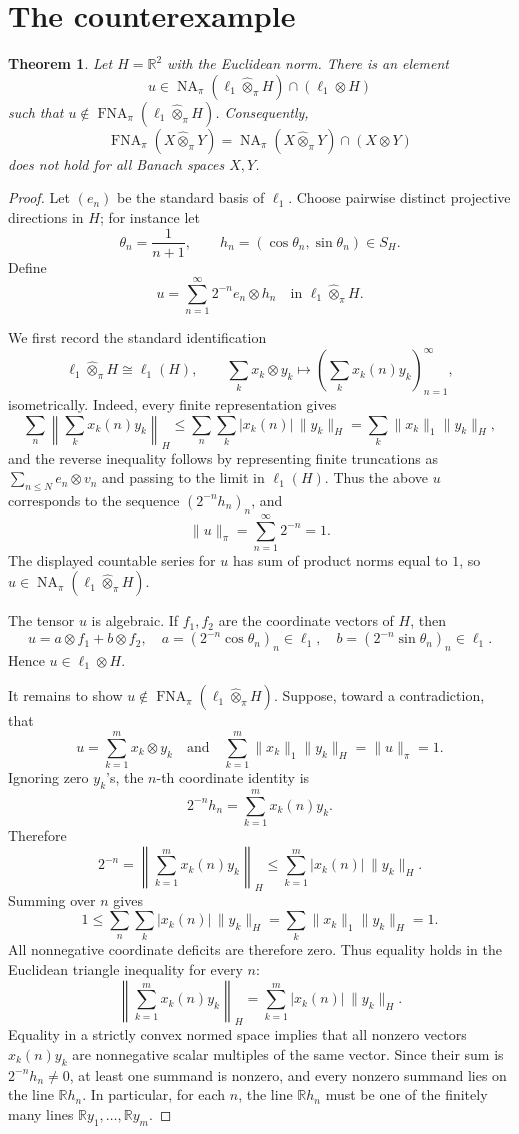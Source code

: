 \documentclass[11pt]{article}
\newtheorem{theorem}{Theorem}
\newcommand{\FNA}{\operatorname{FNA}}
\newcommand{\NA}{\operatorname{NA}}
\newcommand{\R}{\mathbb{R}}
\newcommand{\whot}{\widehat{\otimes}_{\pi}}
\begin{document}
\section*{The counterexample}

\begin{theorem}
Let \(H=\R^2\) with the Euclidean norm.  There is an element
\[
  u\in \NA_{\pi}(\ell_1\whot H)\cap(\ell_1\otimes H)
\]
such that \(u\notin \FNA_{\pi}(\ell_1\whot H)\).  Consequently,
\[
 \FNA_{\pi}(X\whot Y)=\NA_{\pi}(X\whot Y)\cap(X\otimes Y)
\]
does not hold for all Banach spaces \(X,Y\).
\end{theorem}

\begin{proof}
Let \((e_n)\) be the standard basis of \(\ell_1\).  Choose pairwise distinct
projective directions in \(H\); for instance let
\[
  \theta_n=\frac{1}{n+1},\qquad
  h_n=(\cos\theta_n,\sin\theta_n)\in S_H.
\]
Define
\[
  u=\sum_{n=1}^{\infty}2^{-n}e_n\otimes h_n
  \quad\text{in }\ell_1\whot H .
\]

We first record the standard identification
\[
  \ell_1\whot H \cong \ell_1(H),\qquad
  \sum_k x_k\otimes y_k\mapsto
  \left(\sum_k x_k(n)y_k\right)_{n=1}^{\infty},
\]
isometrically.  Indeed, every finite representation gives
\[
  \sum_n\left\|\sum_k x_k(n)y_k\right\|_H
  \leq \sum_n\sum_k |x_k(n)|\,\|y_k\|_H
  =\sum_k\|x_k\|_1\|y_k\|_H,
\]
and the reverse inequality follows by representing finite truncations as
\(\sum_{n\leq N}e_n\otimes v_n\) and passing to the limit in \(\ell_1(H)\).
Thus the above \(u\) corresponds to the sequence
\((2^{-n}h_n)_n\), and
\[
  \|u\|_{\pi}=\sum_{n=1}^{\infty}2^{-n}=1.
\]
The displayed countable series for \(u\) has sum of product norms equal to
\(1\), so \(u\in\NA_{\pi}(\ell_1\whot H)\).

The tensor \(u\) is algebraic.  If \(f_1,f_2\) are the coordinate vectors of
\(H\), then
\[
  u=a\otimes f_1+b\otimes f_2,
  \quad
  a=(2^{-n}\cos\theta_n)_n\in\ell_1,\quad
  b=(2^{-n}\sin\theta_n)_n\in\ell_1.
\]
Hence \(u\in \ell_1\otimes H\).

It remains to show \(u\notin\FNA_{\pi}(\ell_1\whot H)\).  Suppose, toward a
contradiction, that
\[
  u=\sum_{k=1}^{m}x_k\otimes y_k
  \quad\text{and}\quad
  \sum_{k=1}^{m}\|x_k\|_1\|y_k\|_H=\|u\|_{\pi}=1.
\]
Ignoring zero \(y_k\)'s, the \(n\)-th coordinate identity is
\[
  2^{-n}h_n=\sum_{k=1}^{m}x_k(n)y_k.
\]
Therefore
\[
  2^{-n}
  =\left\|\sum_{k=1}^{m}x_k(n)y_k\right\|_H
  \leq \sum_{k=1}^{m}|x_k(n)|\,\|y_k\|_H .
\]
Summing over \(n\) gives
\[
  1
  \leq
  \sum_n\sum_k |x_k(n)|\,\|y_k\|_H
  =
  \sum_k\|x_k\|_1\|y_k\|_H
  =1.
\]
All nonnegative coordinate deficits are therefore zero.  Thus equality holds
in the Euclidean triangle inequality for every \(n\):
\[
  \left\|\sum_{k=1}^{m}x_k(n)y_k\right\|_H
  =
  \sum_{k=1}^{m}|x_k(n)|\,\|y_k\|_H .
\]
Equality in a strictly convex normed space implies that all nonzero vectors
\(x_k(n)y_k\) are nonnegative scalar multiples of the same vector.  Since their
sum is \(2^{-n}h_n\neq 0\), at least one summand is nonzero, and every nonzero
summand lies on the line \(\R h_n\).  In particular, for each \(n\), the line
\(\R h_n\) must be one of the finitely many lines \(\R y_1,\ldots,\R y_m\).


\end{proof}
\end{document}
